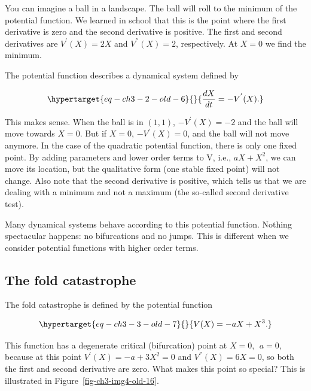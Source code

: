 \documentclass[
  letterpaper,
]{scrbook}
\begin{document}
You can imagine a ball in a landscape. The ball will roll to the minimum
of the potential function. We learned in school that this is the point
where the first derivative is zero and the second derivative is
positive. The first and second derivatives are \(V^{'}(X) = 2X\) and
\(V^{''}(X) = 2\), respectively. At \(X = 0\) we find the minimum.

The potential function describes a dynamical system defined by

\begin{equation}\protect\hypertarget{eq-ch3-2-old-6}{}{
\frac{dX}{dt} = - V^{'}(X).
}\label{eq-ch3-2-old-6}\end{equation}

This makes sense. When the ball is in \((1,1)\), \(- V^{'}(X) = - 2\)
and the ball will move towards \(X = 0\). But if \(X = 0\),
\(- V^{'}(X) = 0\), and the ball will not move anymore. In the case of
the quadratic potential function, there is only one fixed point. By
adding parameters and lower order terms to V, i.e., \({aX + X}^{2}\), we
can move its location, but the qualitative form (one stable fixed point)
will not change. Also note that the second derivative is positive, which
tells us that we are dealing with a minimum and not a maximum (the
so-called second derivative test).

Many dynamical systems behave according to this potential function.
Nothing spectacular happens: no bifurcations and no jumps. This is
different when we consider potential functions with higher order terms.

\hypertarget{the-fold-catastrophe}{%
\subsection{The fold catastrophe}\label{the-fold-catastrophe}}

The fold catastrophe is defined by the potential function

\begin{equation}\protect\hypertarget{eq-ch3-3-old-7}{}{
V(X) = {- aX + X}^{3}.
}\label{eq-ch3-3-old-7}\end{equation}

This function has a degenerate critical (bifurcation) point at
\(X = 0,\ \ a = 0\), because at this point
\(V^{'}(X) = - a + 3X^{2} = 0\) and \(V^{''}(X) = 6X = 0\), so both the
first and second derivative are zero. What makes this point so special?
This is illustrated in Figure~\ref{fig-ch3-img4-old-16}.
\end{document}
